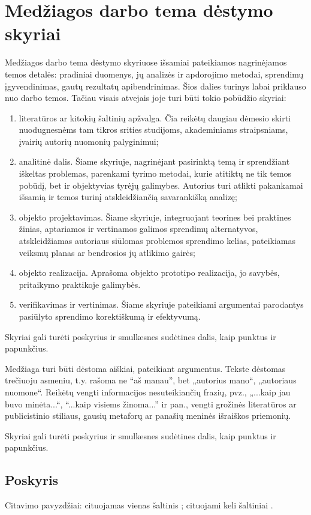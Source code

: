 \documentclass[
    monochrome, %
]{VUMIFSEMasterThesis}
\begin{document}
\section{Medžiagos darbo tema dėstymo skyriai}
Medžiagos darbo tema dėstymo skyriuose išsamiai pateikiamos nagrinėjamos temos detalės:
pradiniai duomenys, jų analizės ir apdorojimo metodai, sprendimų įgyvendinimas, gautų
rezultatų apibendrinimas. Šios dalies turinys labai priklauso nuo darbo temos. Tačiau
visais atvejais joje turi būti tokio pobūdžio skyriai:
\begin{enumerate}
\item literatūros ar kitokių šaltinių apžvalga. Čia reikėtų daugiau dėmesio skirti
nuodugnesnėms tam tikros srities studijoms, akademiniams straipsniams, įvairių autorių
nuomonių palyginimui;
\item analitinė dalis. Šiame skyriuje, nagrinėjant pasirinktą temą ir sprendžiant iškeltas
problemas, parenkami tyrimo metodai, kurie atitiktų ne tik temos pobūdį, bet ir
objektyvias tyrėjų galimybes. Autorius turi atlikti pakankamai išsamią ir temos turinį
atskleidžiančią savarankišką analizę;
\item objekto projektavimas. Šiame skyriuje, integruojant teorines bei praktines žinias,
aptariamos ir vertinamos galimos sprendimų alternatyvos, atskleidžiamas autoriaus 
siūlomas problemos sprendimo kelias, pateikiamas veiksmų planas ar bendrosios jų
atlikimo gairės;
\item objekto realizacija. Aprašoma objekto prototipo realizacija, jo savybės, pritaikymo
praktikoje galimybės.
\item verifikavimas ir vertinimas. Šiame skyriuje pateikiami argumentai parodantys
pasiūlyto sprendimo korektiškumą ir efektyvumą.
\end{enumerate}
Skyriai gali turėti poskyrius ir smulkesnes sudėtines dalis, kaip punktus ir papunkčius.

Medžiaga turi būti dėstoma aiškiai, pateikiant argumentus. Tekste dėstomas
trečiuoju asmeniu, t.y. rašoma ne \enquote{aš manau}, bet „autorius mano“, „autoriaus
nuomone“. Reikėtų vengti informacijos nesuteikiančių frazių, pvz., „...kaip jau
buvo minėta...“, \enquote{...kaip visiems žinoma...} ir pan., vengti grožinės
literatūros ar publicistinio stiliaus, gausių metaforų ar panašių meninės
išraiškos priemonių.

Skyriai gali turėti poskyrius ir smulkesnes sudėtines dalis, kaip punktus ir
papunkčius.

\subsection{Poskyris}
Citavimo pavyzdžiai: cituojamas vienas šaltinis \cite{PvzStraipsnLt}; cituojami
keli šaltiniai \cite{PvzStraipsnEn, ArticleByOrg, PvzKonfLt, PvzKonfEn, PvzKnygLt, PvzKnygEn,
PvzElPubLt, PvzElPubEn, PvzBakLt, PvzMagistrLt, PvzPhdEn}.
\end{document}
